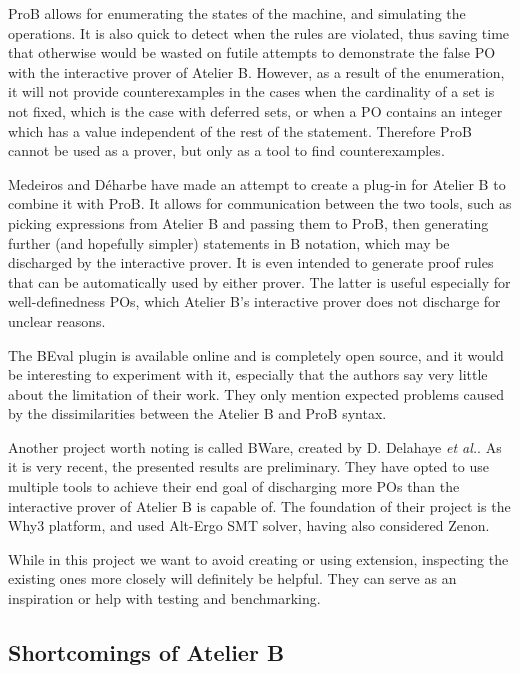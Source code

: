 \documentclass[11pt,journal]{IEEEtran}
\begin{document}
	ProB allows for enumerating the states of the machine, and simulating the operations. It is also quick to detect when the rules are violated, thus saving time that otherwise would be wasted on futile attempts to demonstrate the false PO with the interactive prover of Atelier B.\cite{Prob intro} However, as a result of the enumeration, it will not provide counterexamples in the cases when the cardinality of a set is not fixed, which is the case with deferred sets, or when a PO contains an integer which has a value independent of the rest of the statement. Therefore ProB cannot be used as a prover, but only as a tool to find counterexamples\cite{ProB for eventb}.
	
	Medeiros and D\'{e}harbe\cite{BEval} have made an attempt to create a plug-in for Atelier B to combine it with ProB. It allows for communication between the two tools, such as picking expressions from Atelier B and passing them to ProB, then generating further (and hopefully simpler) statements in B notation, which may be discharged by the interactive prover. It is even intended to generate proof rules that can be automatically used by either prover. The latter is useful especially for well-definedness POs, which Atelier B's interactive prover does not discharge for unclear reasons.
	
	The BEval plugin is available online and is completely open source, and it would be interesting to experiment with it, especially that the authors say very little about the limitation of their work. They only mention expected problems caused by the dissimilarities between the Atelier B and ProB syntax.
	
	Another project worth noting is called BWare, created by D. Delahaye \emph{et al.}.\cite{BWare} As it is very recent, the presented results are preliminary. They have opted to use multiple tools to achieve their end goal of discharging more POs than the interactive prover of Atelier B is capable of. The foundation of their project is the Why3 platform, and used Alt-Ergo SMT solver, having also considered Zenon.

	While in this project we want to avoid creating or using extension, inspecting the existing ones more closely will definitely be helpful. They can serve as an inspiration or help with testing and benchmarking.
	
	\subsection{Shortcomings of Atelier B}
	
\end{document}
